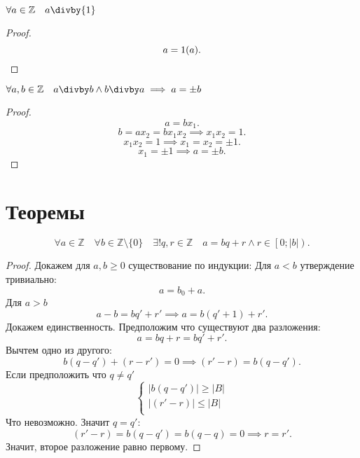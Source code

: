 \documentclass[11pt, oneside]{article}   	%
\begin{document}
    \begin{dlemma}
        $\forall{a\in \mathbb{Z}}\quad a\divby{1}$
        \begin{proof}
            \[ a = 1(a) .\qedhere\] 
        \end{proof}
    \end{dlemma}
    \begin{dlemma}
        $\forall{a, b\in \mathbb{Z}}\quad a\divby b\wedge b\divby a \implies a=\pm{b}$
        \begin{proof}
            \[ a = bx_1.\]
            \[ b = ax_2 = bx_1x_2\implies x_1x_2=1 .\]
            \[ x_1x_2=1\implies x_1=x_2=\pm{1} .\]
            \[ x_1=\pm{1}\implies a=\pm{b}.\]
        \end{proof}
    
    \end{dlemma}
\section{Теоремы}
    \begin{theorem}
        \[ \forall{a \in \mathbb{Z}}\quad\forall{b \in \mathbb{Z}\setminus\{0\}}\quad\exists!q, r \in \mathbb{Z}\quad a=bq + r\wedge r \in \left[0; |b|\right) .\]
        \begin{proof}
            Докажем для $a, b \ge 0$ существование по индукции: Для $a<b$ утверждение тривиально:
            \[ a=b_0+a .\] 
            Для $a>b$
            \[ a-b=bq'+r' \implies a=b(q'+1)+r' .\]
            Докажем единственность. Предположим что существуют два разложения:
                \[ a=bq+r=bq'+r' .\]
            Вычтем одно из другого:
            \[ b(q-q')+(r-r')=0\implies (r'-r)=b(q-q') .\]
            Если предположить что $q \neq q' $
            \[ 
                \begin{cases}
                   |b(q-q')|\ge |B|\\
                   |(r'-r)|\le |B|\\
                \end{cases} 
            \] 
            Что невозможно. Значит $q=q'$:
            \[ (r'-r)=b(q-q')=b(q-q)=0\implies r=r' .\]
            Значит, второе разложение равно первому.
        \end{proof}
    \end{theorem}
\end{document}
